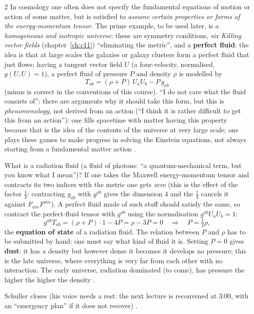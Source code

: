 \begin{paracol}{2}
In cosmology one often does not specify the fundamental equations of motion or action of some matter, but is satisfied to \emph{assume certain properties or forms of the energy-momentum tensor}. The prime example, to be used later, is a \emph{homogeneous and isotropic universe}: these are symmetry conditions, \emph{six Killing vector fields} (chapter~\ref{ch:c11}) ``eliminating the metric'', and a \textbf{perfect fluid}: the idea is that at large scales the galaxies or galaxy clusters form a perfect fluid that just flows; having a tangent vector field $U$ (a four-velocity, normalised, $g(U,U)=1$), a perfect fluid of pressure $P$ and density $\rho$ is modelled by
\[
  T_{ab}=(\rho+P)\,U_aU_b-P\,g_{ab}
\]
(minus is correct in the conventions of this course). ``I do not care what the fluid consists of'': there are arguments why it should take this form, but this is \emph{phenomenology}, not derived from an action (``I think it is rather difficult to get this from an action''): one fills spacetime with matter having this property because that is the idea of the contents of the universe at very large scale; one plays these games to make progress in solving the Einstein equations, not always starting from a fundamental matter action .

\begin{example}\label{ex:c14-eos}
What is a radiation fluid (a fluid of photons: ``a quantum-mechanical term, but you know what I mean'')? If one takes the Maxwell energy-momentum tensor and contracts its two indices with the metric one gets \emph{zero} (this is the effect of the factor $\tfrac14$: contracting $g_{ab}$ with $g^{ab}$ gives the dimension $4$ and the $\tfrac14$ cancels it against $F_{am}F^{am}$). A perfect fluid made of such stuff should satisfy the same, so contract the perfect-fluid tensor with $g^{ab}$ using the normalisation $g^{ab}U_aU_b=1$:
\[
  g^{ab}T_{ab}=(\rho+P)\cdot1-4P=\rho-3P=0\quad\Longrightarrow\quad P=\tfrac13\rho,
\]
the \textbf{equation of state} of a radiation fluid. The relation between $P$ and $\rho$ has to be submitted by hand: one must say what kind of fluid it is. Setting $P=0$ gives \textbf{dust}: it has a density but however dense it becomes it develops no pressure; this is the late universe, where everything is very far from each other with no interaction. The early universe, radiation dominated (to come), has pressure the higher the higher the density .
\end{example}
Schuller closes (his voice needs a rest: the next lecture is reconvened at 3:00, with an ``emergency plan'' if it does not recover) .


\end{paracol}

